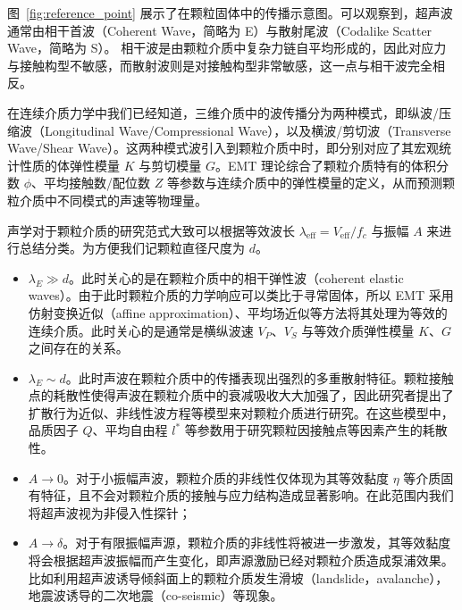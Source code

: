 图~\ref{fig:reference_point} 展示了在颗粒固体中的传播示意图。可以观察到，超声波通常由相干首波（Coherent Wave，简略为 E）与散射尾波（Codalike Scatter Wave，简略为 S）。 相干波是由颗粒介质中复杂力链自平均形成的，因此对应力与接触构型不敏感，而散射波则是对接触构型非常敏感，这一点与相干波完全相反\cite{PhysRevLett.93.154303}。

在连续介质力学中我们已经知道，三维介质中的波传播分为两种模式，即纵波/压缩波（Longitudinal Wave/Compressional Wave），以及横波/剪切波（Transverse Wave/Shear Wave）。这两种模式波引入到颗粒介质中时，即分别对应了其宏观统计性质的体弹性模量 $K$ 与剪切模量 $G$。EMT 理论综合了颗粒介质特有的体积分数 $\phi$、平均接触数/配位数 $Z$ 等参数与连续介质中的弹性模量的定义，从而预测颗粒介质中不同模式的声速等物理量。

声学对于颗粒介质的研究范式大致可以根据等效波长 $\lambda_{\text{eff}} = V_{\text{eff}}/f_{c}$ 与振幅 $A$ 来进行总结分类。为方便我们记颗粒直径尺度为 $d$。

\begin{itemize}
  \item $\lambda_{E}\gg d$。此时关心的是在颗粒介质中的相干弹性波（coherent elastic waves）。由于此时颗粒介质的力学响应可以类比于寻常固体，所以 EMT 采用仿射变换近似（affine approximation）、平均场近似等方法将其处理为等效的连续介质。此时关心的是通常是横纵波速 $V_{P}$、$V_{S}$ 与等效介质弹性模量 $K$、$G$ 之间存在的关系。
  \item $\lambda_{E}\sim d$。此时声波在颗粒介质中的传播表现出强烈的多重散射特征。颗粒接触点的耗散性使得声波在颗粒介质中的衰减吸收大大加强了，因此研究者提出了扩散行为近似\cite{PhysRevLett.93.154303}、非线性波方程\cite{Transitional,hamilton_nonlinear_1998}等模型来对颗粒介质进行研究。在这些模型中，品质因子 $Q$、平均自由程 $l^{*}$ 等参数用于研究颗粒因接触点等因素产生的耗散性。
  \item $A\rightarrow 0$。对于小振幅声波，颗粒介质的非线性仅体现为其等效黏度 $\eta$ 等介质固有特征，且不会对颗粒介质的接触与应力结构造成显著影响。在此范围内我们将超声波视为非侵入性探针；
  \item $A\rightarrow \delta$。对于有限振幅声源，颗粒介质的非线性将被进一步激发，其等效黏度将会根据超声波振幅而产生变化，即声源激励已经对颗粒介质造成泵浦效果。比如利用超声波诱导倾斜面上的颗粒介质发生滑坡（landslide，avalanche）\cite{PhysRevE.102.042901}，地震波诱导的二次地震（co-seismic）\cite{Johnson_2005}等现象。
\end{itemize}